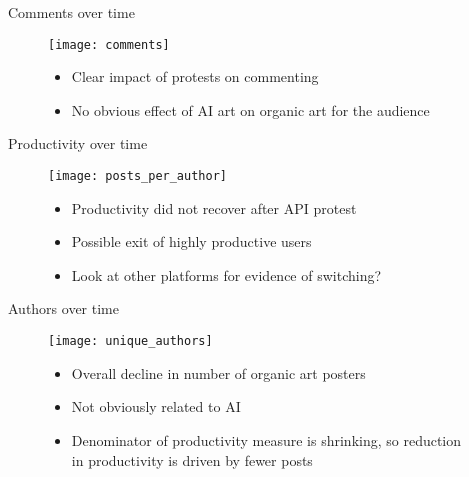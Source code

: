 \documentclass[aspectratio=169]{beamer}
\def\defaultscalefig{0.4}
\begin{document}
\begin{frame}{Comments over time}
	\begin{figure}
		\begin{minipage}{0.45\textwidth}
			\centering
			\texttt{[image: comments]}
		\end{minipage}\hfill
		\begin{minipage}{0.45\textwidth}
			\centering
			\begin{itemize}
				\item Clear impact of protests on commenting
				\item No obvious effect of AI art on organic art
					for the audience
			\end{itemize}
		\end{minipage}
	\end{figure}
\end{frame}

\begin{frame}{Productivity over time}
	\begin{figure}
		\begin{minipage}{0.45\textwidth}
			\centering
			\texttt{[image: posts\_per\_author]}
		\end{minipage}\hfill
		\begin{minipage}{0.45\textwidth}
			\centering
			\begin{itemize}
				\item Productivity did not recover after API protest
				\item Possible exit of highly productive users
				\item Look at other platforms for evidence of switching?
			\end{itemize}
		\end{minipage}
	\end{figure}
\end{frame}

\begin{frame}{Authors over time}
	\begin{figure}
		\begin{minipage}{0.45\textwidth}
			\centering
			\texttt{[image: unique\_authors]}
		\end{minipage}\hfill
		\begin{minipage}{0.45\textwidth}
			\centering
			\begin{itemize}
				\item Overall decline in number of organic art posters
				\item Not obviously related to AI
				\item Denominator of productivity measure is shrinking,
					so reduction in productivity is driven by fewer posts
			\end{itemize}
		\end{minipage}
	\end{figure}
\end{frame}
\end{document}
